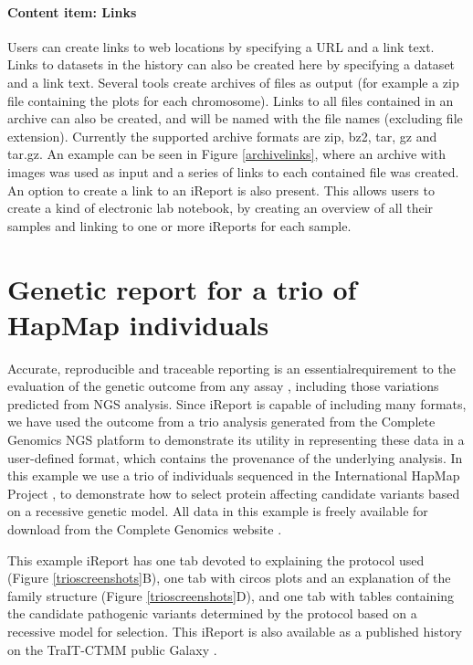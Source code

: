 \paragraph*{Content item: Links}
Users can create links to web locations by specifying a URL and a link text. Links to datasets in the history can also be created here by specifying a dataset and a link text. Several tools create archives of files as output (for example a zip file containing the plots for each chromosome). Links to all files contained in an archive can also be created, and will be named with the file names (excluding file extension). Currently the supported archive formats are zip, bz2, tar, gz and tar.gz. An example can be seen in Figure \ref{archivelinks}, where an archive with images was used as input and a series of links to each contained file was created. An option to create a link to an iReport is also present. This allows users to create a kind of electronic lab notebook, by creating an overview of all their samples and linking to one or more iReports for each sample.

\section*{Genetic report for a trio of HapMap individuals}

Accurate, reproducible and traceable reporting is an essentialrequirement to the evaluation of the genetic outcome from any assay \cite{skyline}, including those variations predicted from NGS analysis. Since iReport is capable of including many formats, we have used the outcome from a trio analysis generated from the Complete Genomics \cite{drmanac} NGS platform to demonstrate its utility in representing these data in a user-defined format, which contains the provenance of the underlying analysis. In this example we use a trio of individuals sequenced in the International HapMap Project \cite{hapmap}\cite{hapmap2}, to demonstrate how to select protein affecting candidate variants based on a recessive genetic model.  All data in this example is freely available for download from the Complete Genomics website \cite{url-CGpublicdata}.

This example iReport has one tab devoted to explaining the protocol used (Figure \ref{trioscreenshots}B), one tab with circos plots and an explanation of the family structure (Figure \ref{trioscreenshots}D), and one tab with tables containing the candidate pathogenic variants determined by the protocol based on a recessive model for selection. This iReport is also available as a published history on the TraIT-CTMM public Galaxy \cite{url-traitgalaxy}.


